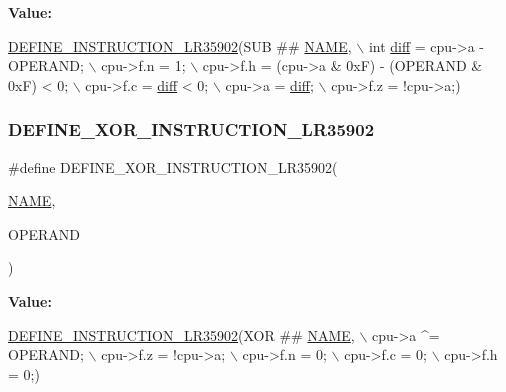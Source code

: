 {\bfseries Value\+:}
\begin{DoxyCode}
\mbox{\hyperlink{isa-lr35902_8c_a3128fc43c5d01e8b51f67901c0b4b5ef}{DEFINE\_INSTRUCTION\_LR35902}}(SUB ## \mbox{\hyperlink{inflate_8h_a164ea0159d5f0b5f12a646f25f99eceaa67bc2ced260a8e43805d2480a785d312}{NAME}}, \(\backslash\)
        \textcolor{keywordtype}{int} \mbox{\hyperlink{isa-lr35902_8c_a65f3a8178e1f997a7a19a988bb0f4e1a}{diff}} = cpu->a - OPERAND; \(\backslash\)
        cpu->f.n = 1; \(\backslash\)
        cpu->f.h = (cpu->a & 0xF) - (OPERAND & 0xF) < 0; \(\backslash\)
        cpu->f.c = \mbox{\hyperlink{isa-lr35902_8c_a65f3a8178e1f997a7a19a988bb0f4e1a}{diff}} < 0; \(\backslash\)
        cpu->a = \mbox{\hyperlink{isa-lr35902_8c_a65f3a8178e1f997a7a19a988bb0f4e1a}{diff}}; \(\backslash\)
        cpu->f.z = !cpu->a;)
\end{DoxyCode}
\mbox{\label{isa-lr35902_8c_a87fe53bda6581408cd93385a5620dcfd}} 
\subsubsection{\texorpdfstring{D\+E\+F\+I\+N\+E\+\_\+\+X\+O\+R\+\_\+\+I\+N\+S\+T\+R\+U\+C\+T\+I\+O\+N\+\_\+\+L\+R35902}{DEFINE\_XOR\_INSTRUCTION\_LR35902}}
{\footnotesize\ttfamily \#define D\+E\+F\+I\+N\+E\+\_\+\+X\+O\+R\+\_\+\+I\+N\+S\+T\+R\+U\+C\+T\+I\+O\+N\+\_\+\+L\+R35902(\begin{DoxyParamCaption}\item[{}]{\mbox{\hyperlink{inflate_8h_a164ea0159d5f0b5f12a646f25f99eceaa67bc2ced260a8e43805d2480a785d312}{N\+A\+ME}},  }\item[{}]{O\+P\+E\+R\+A\+ND }\end{DoxyParamCaption})}

{\bfseries Value\+:}
\begin{DoxyCode}
\mbox{\hyperlink{isa-lr35902_8c_a3128fc43c5d01e8b51f67901c0b4b5ef}{DEFINE\_INSTRUCTION\_LR35902}}(XOR ## \mbox{\hyperlink{inflate_8h_a164ea0159d5f0b5f12a646f25f99eceaa67bc2ced260a8e43805d2480a785d312}{NAME}}, \(\backslash\)
        cpu->a ^= OPERAND; \(\backslash\)
        cpu->f.z = !cpu->a; \(\backslash\)
        cpu->f.n = 0; \(\backslash\)
        cpu->f.c = 0; \(\backslash\)
        cpu->f.h = 0;)
\end{DoxyCode}


